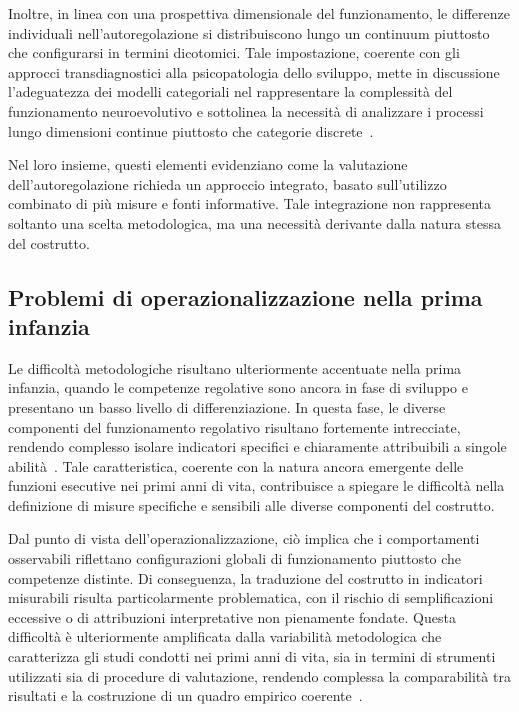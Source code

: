             Inoltre, in linea con una prospettiva dimensionale del funzionamento, le differenze individuali nell'autoregolazione si distribuiscono lungo un continuum piuttosto che configurarsi in termini dicotomici. Tale impostazione, coerente con gli approcci transdiagnostici alla psicopatologia dello sviluppo, mette in discussione l'adeguatezza dei modelli categoriali nel rappresentare la complessità del funzionamento neuroevolutivo e sottolinea la necessità di analizzare i processi lungo dimensioni continue piuttosto che categorie discrete~\cite{beauchaine2019,astle2022}.

            Nel loro insieme, questi elementi evidenziano come la valutazione dell'autoregolazione richieda un approccio integrato, basato sull'utilizzo combinato di più misure e fonti informative. Tale integrazione non rappresenta soltanto una scelta metodologica, ma una necessità derivante dalla natura stessa del costrutto.

        \subsection{Problemi di operazionalizzazione nella prima infanzia}
        \label{sec:3_1_2}

            Le difficoltà metodologiche risultano ulteriormente accentuate nella prima infanzia, quando le competenze regolative sono ancora in fase di sviluppo e presentano un basso livello di differenziazione. In questa fase, le diverse componenti del funzionamento regolativo risultano fortemente intrecciate, rendendo complesso isolare indicatori specifici e chiaramente attribuibili a singole abilità~\cite{blair2015,diamond2013}. Tale caratteristica, coerente con la natura ancora emergente delle funzioni esecutive nei primi anni di vita, contribuisce a spiegare le difficoltà nella definizione di misure specifiche e sensibili alle diverse componenti del costrutto.

            Dal punto di vista dell'operazionalizzazione, ciò implica che i comportamenti osservabili riflettano configurazioni globali di funzionamento piuttosto che competenze distinte. Di conseguenza, la traduzione del costrutto in indicatori misurabili risulta particolarmente problematica, con il rischio di semplificazioni eccessive o di attribuzioni interpretative non pienamente fondate. Questa difficoltà è ulteriormente amplificata dalla variabilità metodologica che caratterizza gli studi condotti nei primi anni di vita, sia in termini di strumenti utilizzati sia di procedure di valutazione, rendendo complessa la comparabilità tra risultati e la costruzione di un quadro empirico coerente~\cite{berni2025}.

